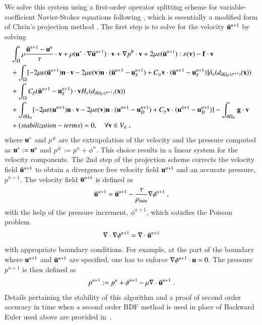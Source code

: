 \documentclass[final,3p,times]{elsarticle}
\newcommand{\bg}{\mathbf{g}}
\begin{document}
We solve this system using a first-order operator splitting scheme for variable-coefficient Navier-Stokes equations following \cite{GS09}, which is essentially a modified form of Chrin's projection method \cite{chorin1968numerical}. The first step is to solve for the velocity $\tilde{\mathbf{u}}^{n+1}$ by solving
\begin{align}
   &\int_\Omega\rho\frac{\tilde{\bu}^{n+1}-\bu^n}{\tau}\cdot\bv + \rho(\bu^*\cdot\nabla\tilde{\bu}^{n+1}) \cdot \bv 
   +\nabla p^{\#}\cdot\bv +2\mu \varepsilon(\tilde{\bu}^{n+1}):\varepsilon(\bv)
   -\bef\cdot\bv\nonumber\\
   &+\int_\Omega [-2\mu \varepsilon(\tilde{\bu}^{n+1})\bn\cdot\bv
   -2\mu\varepsilon(\bv)\bn\cdot(\tilde{\bu}^{n+1}-\bu_S^{n+1})
   +C_\alpha\bv\cdot(\tilde{\bu}^{n+1}-\bu_S^{n+1})]\delta_\epsilon(d_{\partial\Omega_S(t^{n+1})}(\bx))\nonumber\\
   &+\int_\Omega C_\beta (\tilde{\bu}^{n+1}-\bu_S^{n+1})\cdot\bv H_\epsilon(d_{\partial\Omega_S(t^{n+1})}(\bx))\nonumber\\
   &+\int_{\partial\Omega_D} [-2\mu\varepsilon(\bu^{n+1})\bn\cdot\bv
   -2\mu\varepsilon(\bv)\bn\cdot(\bu^{n+1}-\bu_D^{n+1})
   +C_\gamma\bv\cdot(\bu^{n+1}-\bu_D^{n+1})]-\int_{\partial\Omega_N}\bg\cdot\bv\nonumber\\
   &+(stabilization-terms)=0,\quad\forall \bv\in V_h \; ,
\end{align}
where $\mathbf{u}^*$ and $p^\#$ are the extrapolation of the velocity and the pressure computed as $\mathbf{u}^*:=\mathbf{u}^n$ and $p^\#:=p^n+\phi^{n}$. This choice results in a linear system for the velocity components.
The 2nd step of the projection scheme corrects the velocity field $\tilde{\mathbf{u}}^{n+1}$ to obtain 
a divergence free velocity field ${\mathbf{u}}^{n+1}$ and an accurate pressure, $p^{n+1}$. The velocity field $\tilde{\mathbf{u}}^{n+1}$ is defined as 
\begin{align*}
   \tilde{\mathbf{u}}^{n+1} = \tilde{\mathbf{u}}^{n+1} - \frac{\tau}{\rho_{\min}}\nabla\phi^{n+1} \; ,
\end{align*}
with the help of the pressure increment, $\phi^{n+1}$, which satisfies the Poisson problem 
\begin{align*}
   \nabla\cdot\nabla\phi^{n+1} = \nabla\cdot\tilde{\mathbf{u}}^{n+1} 
\end{align*}
with appropriate boundary conditions. For example, at the part of the boundary where $\mathbf{u}^{n+1}$ and 
$\tilde{\mathbf{u}}^{n+1}$ are specified, one has to enforce $\nabla\phi^{n+1}\cdot\mathbf{n}=0$.
The pressure $p^{n+1}$ is then defined as 
\begin{align*}
   p^{n+1} := p^n + \phi^{n+1} - \mu \nabla\cdot\tilde{\mathbf{u}}^{n+1} \; .
\end{align*}
Details pertaining the stability of this algorithm and a proof of second order accuracy in time when a second order BDF method is used in place of Backward
Euler used above are provided in~\cite{GS09}.
\end{document}
